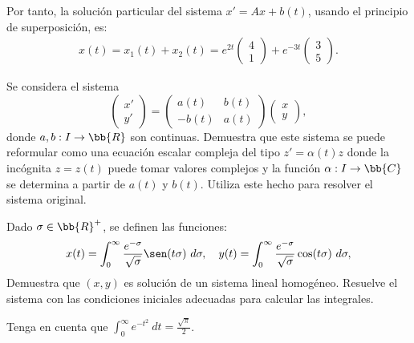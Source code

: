 \begin{ejercicio}
    Por tanto, la solución particular del sistema $x'=Ax+b(t)$, usando el principio de superposición, es:
    \begin{align*}
        x(t) = x_1(t) + x_2(t) = e^{2t}\begin{pmatrix}
            4\\
            1
        \end{pmatrix} + e^{-3t}\begin{pmatrix}
            3\\
            5
        \end{pmatrix}.
    \end{align*}
\end{ejercicio}

\begin{ejercicio}\label{ej:5.5}
    Se considera el sistema
    \[
        \begin{pmatrix}
            x'\\
            y'
        \end{pmatrix}
        =
        \begin{pmatrix}
            a(t) & b(t)\\
            -b(t) & a(t)
        \end{pmatrix}
        \begin{pmatrix}
            x\\
            y
        \end{pmatrix},
    \]
    donde $a, b : I \to \bb{R}$ son continuas. Demuestra que este sistema se puede reformular como una ecuación escalar compleja del tipo $z' = \alpha(t)z$ donde la incógnita $z = z(t)$ puede tomar valores complejos y la función $\alpha : I \to \bb{C}$ se determina a partir de $a(t)$ y $b(t)$. Utiliza este hecho para resolver el sistema original.
\end{ejercicio}

\begin{ejercicio}\label{ej:5.6}
    Dado $\sigma\in \bb{R}^+$, se definen las funciones:
    \[
        x(t) = \int_0^\infty \frac{e^{-\sigma}}{\sqrt{\sigma}}\sen(t\sigma)~d\sigma, \quad y(t) = \int_0^\infty \frac{e^{-\sigma}}{\sqrt{\sigma}}\cos(t\sigma)~d\sigma,
    \]
    Demuestra que $(x, y)$ es solución de un sistema lineal homogéneo. Resuelve el sistema con las condiciones iniciales adecuadas para calcular las integrales.
    \begin{observacion}
        Tenga en cuenta que
        $\displaystyle \int_0^\infty e^{-t^2}~dt = \frac{\sqrt{\pi}}{2}$.
    \end{observacion}

\end{ejercicio}

